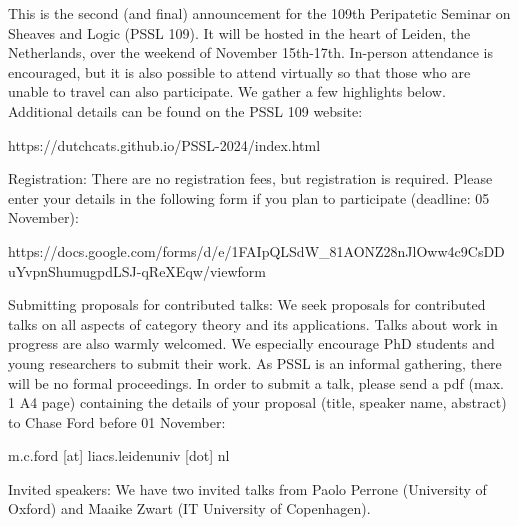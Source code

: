 This is the second (and final) announcement for the 109th Peripatetic Seminar on Sheaves and Logic (PSSL 109). It will be hosted in the heart of Leiden, the Netherlands, over the weekend of November 15th-17th. In-person attendance is encouraged, but it is also possible to attend virtually so that those who are unable to travel can also participate. We gather a few highlights below. Additional details can be found on the PSSL 109 website:

https://dutchcats.github.io/PSSL-2024/index.html

Registration:
There are no registration fees, but registration is required. Please enter your details in the following form if you plan to participate (deadline: 05 November):

https://docs.google.com/forms/d/e/1FAIpQLSdW_81AONZ28nJlOww4c9CsDDuYvpnShumugpdLSJ-qReXEqw/viewform


Submitting proposals for contributed talks:
We seek proposals for contributed talks on all aspects of category theory and its applications. Talks about work in progress are also warmly welcomed. We especially encourage PhD students and young researchers to submit their work. As PSSL is an informal gathering, there will be no formal proceedings. In order to submit a talk, please send a pdf (max. 1 A4 page) containing the details of your proposal (title, speaker name, abstract) to Chase Ford before 01 November:

m.c.ford [at] liacs.leidenuniv [dot] nl


Invited speakers:
We have two invited talks from Paolo Perrone (University of Oxford) and Maaike Zwart (IT University of Copenhagen).